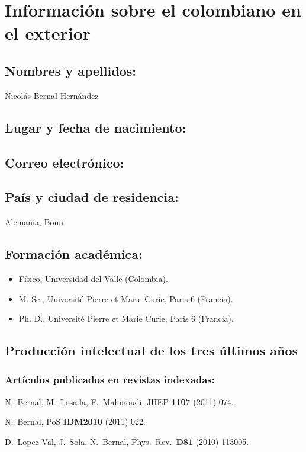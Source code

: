\section{Información sobre el colombiano en el exterior}
\subsection{Nombres y apellidos: }
Nicolás Bernal Hernández
\subsection{Lugar y fecha de nacimiento: }
\fnbernal
\subsection{Correo electrónico: }
\embernal
\subsection{País y ciudad de residencia: }
Alemania, Bonn
\subsection{Formación académica:}
\begin{itemize}
\item Físico, Universidad del Valle (Colombia).
\item M. Sc.,  Université Pierre et Marie Curie, Paris 6 (Francia).
\item Ph. D.,  Université Pierre et Marie Curie, Paris 6 (Francia).
\end{itemize}
\subsection{Producción intelectual de los tres últimos años}
\subsubsection{Artículos publicados en revistas indexadas:}
  N.~Bernal, M.~Losada, F.~Mahmoudi,
  JHEP {\bf 1107 } (2011)  074.

  N.~Bernal,
  PoS {\bf IDM2010 } (2011)  022.

  D.~Lopez-Val, J.~Sola, N.~Bernal,
  Phys.\ Rev.\  {\bf D81 } (2010)  113005.

